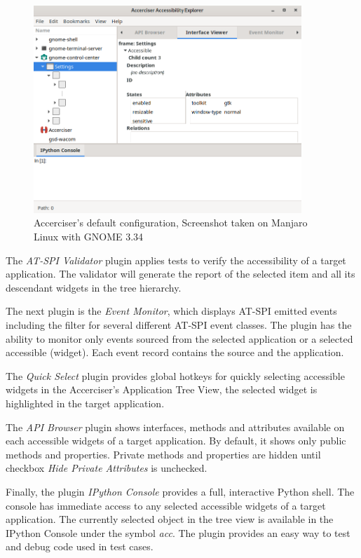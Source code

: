 \begin{figure}[hbt]
	\centering
	\includegraphics[width=0.9\textwidth]{obrazky-figures/accerciser.png}
	\caption{Accerciser's default configuration, Screenshot taken on Manjaro Linux with GNOME 3.34}
	\label{Accerciser_img}
\end{figure}

The \textit{AT-SPI Validator} plugin applies tests to verify the accessibility of a target application. The validator will generate the report of the selected item and all its descendant widgets in the tree hierarchy.

The next plugin is the \textit{Event Monitor}, which displays AT-SPI emitted events including the filter for several different AT-SPI event classes. The plugin has the ability to monitor only events sourced from the selected application or a selected accessible (widget). Each event record contains the source and the application.

The \textit{Quick Select} plugin provides global hotkeys for quickly selecting accessible widgets in the Accerciser's Application Tree View, the selected widget is highlighted in the target application.

The \textit{API Browser} plugin shows interfaces, methods and attributes available on each accessible widgets of a target application. By default, it shows only public methods and properties. Private methods and properties are hidden until checkbox \textit{Hide Private Attributes} is unchecked.
 
Finally, the plugin \textit{IPython Console} provides a full, interactive Python shell. The console has immediate access to any selected accessible widgets of a target application. The currently selected object in the tree view is available in the IPython Console under the symbol \textit{acc}. The plugin provides an easy way to test and debug code used in test cases.    
